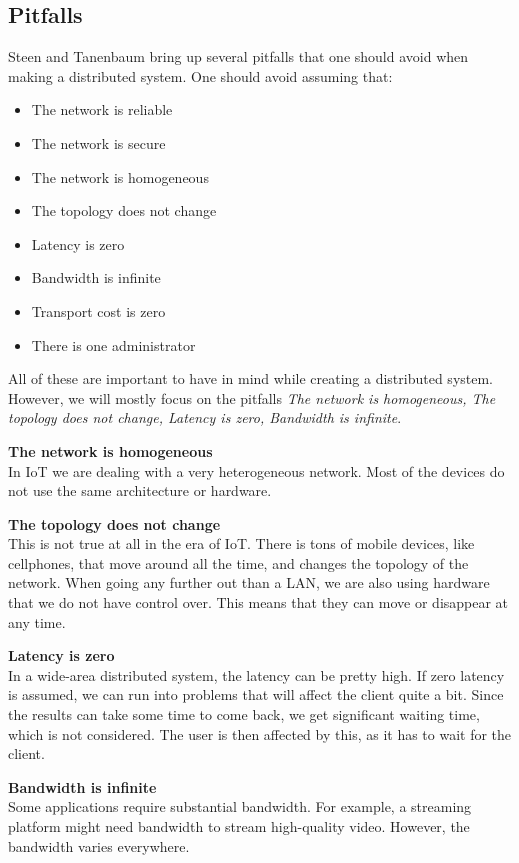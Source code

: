 \subsection{Pitfalls}
Steen and Tanenbaum \cite{steen_distributed_2017} bring up several pitfalls that one should avoid when making a distributed system. One should avoid assuming that:
\begin{itemize}
    \item The network is reliable
    \item The network is secure
    \item The network is homogeneous
    \item The topology does not change
    \item Latency is zero
    \item Bandwidth is infinite
    \item Transport cost is zero
    \item There is one administrator
\end{itemize}
All of these are important to have in mind while creating a distributed system. However, we will mostly focus on the pitfalls \textit{The network is homogeneous, The topology does not change, Latency is zero, Bandwidth is infinite}.

\textbf{The network is homogeneous} \\
In IoT we are dealing with a very heterogeneous network. Most of the devices do not use the same architecture or hardware.

\textbf{The topology does not change} \\
This is not true at all in the era of IoT. There is tons of mobile devices, like cellphones, that move around all the time, and changes the topology of the network. When going any further out than a LAN, we are also using hardware that we do not have control over. This means that they can move or disappear at any time.

\textbf{Latency is zero} \\
In a wide-area distributed system, the latency can be pretty high. If zero latency is assumed, we can run into problems that will affect the client quite a bit. Since the results can take some time to come back, we get significant waiting time, which is not considered. The user is then affected by this, as it has to wait for the client. 

\textbf{Bandwidth is infinite} \\
Some applications require substantial bandwidth. For example, a streaming platform might need bandwidth to stream high-quality video. However, the bandwidth varies everywhere.


